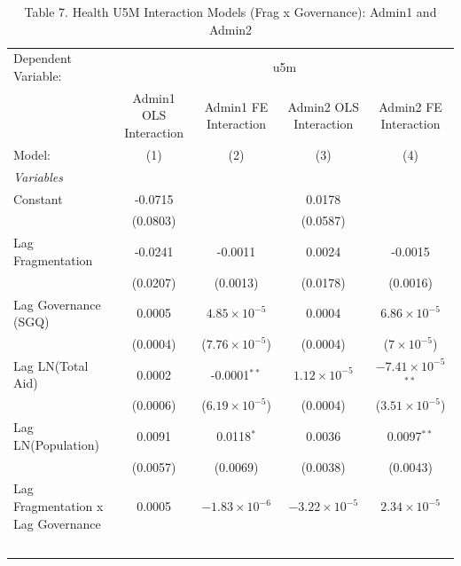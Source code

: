 \begin{table}[htbp]
   \caption{Table 7. Health U5M Interaction Models (Frag x Governance): Admin1 and Admin2}
   \centering
   \begin{tabular}{lcccc}
      \tabularnewline \midrule \midrule
      Dependent Variable: & \multicolumn{4}{c}{u5m}\\
                                         & Admin1 OLS Interaction & Admin1 FE Interaction   & Admin2 OLS Interaction & Admin2 FE Interaction \\   
      Model:                             & (1)                    & (2)                     & (3)                    & (4)\\  
      \midrule
      \emph{Variables}\\
      Constant                           & -0.0715                &                         & 0.0178                 &   \\   
                                         & (0.0803)               &                         & (0.0587)               &   \\   
      Lag Fragmentation                  & -0.0241                & -0.0011                 & 0.0024                 & -0.0015\\   
                                         & (0.0207)               & (0.0013)                & (0.0178)               & (0.0016)\\   
      Lag Governance (SGQ)               & 0.0005                 & $4.85\times 10^{-5}$    & 0.0004                 & $6.86\times 10^{-5}$\\    
                                         & (0.0004)               & ($7.76\times 10^{-5}$)  & (0.0004)               & ($7\times 10^{-5}$)\\    
      Lag LN(Total Aid)                  & 0.0002                 & -0.0001$^{**}$          & $1.12\times 10^{-5}$   & $-7.41\times 10^{-5}$$^{**}$\\    
                                         & (0.0006)               & ($6.19\times 10^{-5}$)  & (0.0004)               & ($3.51\times 10^{-5}$)\\    
      Lag LN(Population)                 & 0.0091                 & 0.0118$^{*}$            & 0.0036                 & 0.0097$^{**}$\\   
                                         & (0.0057)               & (0.0069)                & (0.0038)               & (0.0043)\\   
      Lag Fragmentation x Lag Governance & 0.0005                 & $-1.83\times 10^{-6}$   & $-3.22\times 10^{-5}$  & $2.34\times 10^{-5}$\\    
$$
\end{tabular}
\end{table}

